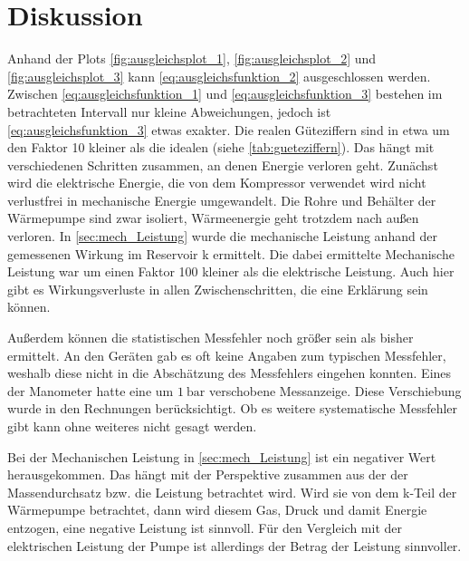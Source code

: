 \section{Diskussion}
Anhand der Plots \ref{fig:ausgleichsplot_1}, \ref{fig:ausgleichsplot_2} und \ref{fig:ausgleichsplot_3}
kann \eqref{eq:ausgleichsfunktion_2} ausgeschlossen werden. 
Zwischen \eqref{eq:ausgleichsfunktion_1} und \eqref{eq:ausgleichsfunktion_3} bestehen im betrachteten Intervall nur kleine Abweichungen,
jedoch ist \eqref{eq:ausgleichsfunktion_3} etwas exakter.
Die realen Güteziffern sind in etwa um den Faktor 10 kleiner als die idealen (siehe \ref{tab:gueteziffern}).
Das hängt mit verschiedenen Schritten zusammen, an denen Energie verloren geht.
Zunächst wird die elektrische Energie, die von dem Kompressor verwendet wird
nicht verlustfrei in mechanische Energie umgewandelt.
Die Rohre und Behälter der Wärmepumpe sind zwar isoliert, 
Wärmeenergie geht trotzdem nach außen verloren.
In \ref{sec:mech_Leistung} wurde die mechanische Leistung anhand der gemessenen Wirkung im Reservoir k   ermittelt.
Die dabei ermittelte Mechanische Leistung war um einen Faktor 100 kleiner als die elektrische Leistung.
Auch hier gibt es Wirkungsverluste in allen Zwischenschritten, die eine Erklärung sein können.

Außerdem können die statistischen Messfehler noch größer sein als bisher ermittelt.
An den Geräten gab es oft keine Angaben zum typischen Messfehler,
weshalb diese nicht in die Abschätzung des Messfehlers eingehen konnten.
Eines der Manometer hatte eine um $\qty{1}{\bar}$ verschobene Messanzeige.
Diese Verschiebung wurde in den Rechnungen berücksichtigt.
Ob es weitere systematische Messfehler gibt kann ohne weiteres nicht gesagt werden.

Bei der Mechanischen Leistung in \ref{sec:mech_Leistung} ist ein negativer Wert herausgekommen. 
Das hängt mit der Perspektive zusammen aus der der Massendurchsatz bzw. die Leistung betrachtet wird.
Wird sie von dem k-Teil der Wärmepumpe betrachtet, dann wird diesem Gas, Druck und damit Energie entzogen,
eine negative Leistung ist sinnvoll.
Für den Vergleich mit der elektrischen Leistung der Pumpe ist allerdings der Betrag der Leistung sinnvoller.